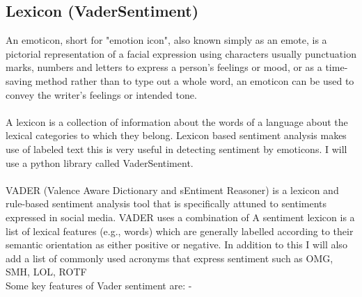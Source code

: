 \subsection{Lexicon (VaderSentiment)}
An emoticon, short for "emotion icon", also known simply as an emote, is a pictorial representation of a facial expression using characters usually punctuation marks, numbers and letters to express a person's feelings or mood, or as a time-saving method rather than to type out a whole word, an emoticon can be used to convey the writer's feelings or intended tone. \\ \\
A lexicon is a collection of information about the words of a language about the lexical categories to which they belong. Lexicon based sentiment analysis makes use of labeled text this is very useful in detecting sentiment by emoticons. I will use a python library called VaderSentiment.\\ \\
VADER (Valence Aware Dictionary and sEntiment Reasoner) is a lexicon and rule-based sentiment analysis tool that is specifically attuned to sentiments expressed in social media. VADER uses a combination of A sentiment lexicon is a list of lexical features (e.g., words) which are generally labelled according to their semantic orientation as either positive or negative. In addition to this I will also add a list of commonly used acronyms that express sentiment such as OMG, SMH, LOL, ROTF \\
Some key features of Vader sentiment are: -

